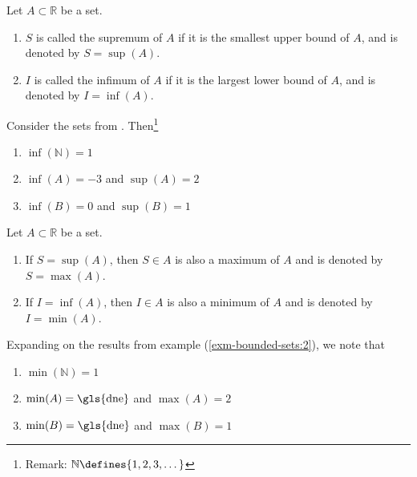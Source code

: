 \begin{definition}\label{def-supremum-infimum-sets}
    Let $A\subset\mathbb{R}$ be a set.
    \begin{enumerate}
        \item $S$ is called the supremum of $A$ if it is the smallest upper bound 
        of $A$, and is denoted by $S=\sup(A)$.
        \item $I$ is called the infimum of $A$ if it is the largest lower bound 
        of $A$, and is denoted by $I=\inf(A)$.
    \end{enumerate}
\end{definition}

\begin{exm}\label{exm-bounded-sets:2}
    Consider the sets from . Then\footnote{Remark:
    $\mathbb{N}\defines\{1,2,3,\dots\}$}
    \begin{enumerate}
        \item $\inf(\mathbb{N})=1$
        \item $\inf(A)=-3$ and $\sup(A)=2$
        \item $\inf(B)=0$ and $\sup(B)=1$
    \end{enumerate}
\end{exm}

\begin{definition}\label{def-maximum-minimum}
    Let $A\subset\mathbb{R}$ be a set.
    \begin{enumerate}
        \item If $S=\sup(A)$, then $S\in A$ is also a maximum of $A$ and is denoted by $S=\max(A)$.
        \item If $I=\inf(A)$, then $I\in A$ is also a minimum of $A$ and is denoted by $I=\min(A)$.
    \end{enumerate}
\end{definition}

\begin{exm}\label{exm-bounded-sets:3}
    Expanding on the results from example (\ref{exm-bounded-sets:2}), we note that
    \begin{enumerate}
        \item $\min(\mathbb{N})=1$
        \item $\min(A)=\text{\gls{dne}}$ and $\max(A)=2$
        \item $\min(B)=\text{\gls{dne}}$ and $\max(B)=1$
    \end{enumerate}
\end{exm}


